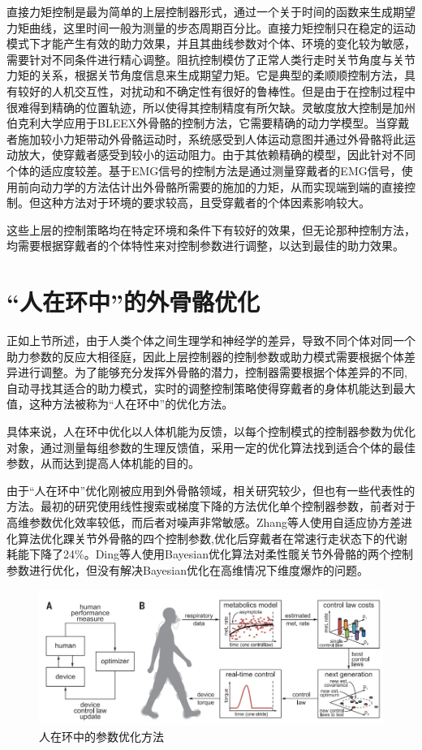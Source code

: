 直接力矩控制是最为简单的上层控制器形式，通过一个关于时间的函数来生成期望力矩曲线\cite{p32,p33}，这里时间一般为测量的步态周期百分比。直接力矩控制只在稳定的运动模式下才能产生有效的助力效果，并且其曲线参数对个体、环境的变化较为敏感，需要针对不同条件进行精心调整。阻抗控制模仿了正常人类行走时关节角度与关节力矩的关系，根据关节角度信息来生成期望力矩\cite{p34}。它是典型的柔顺顺控制方法，具有较好的人机交互性，对扰动和不确定性有很好的鲁棒性。但是由于在控制过程中很难得到精确的位置轨迹，所以使得其控制精度有所欠缺。灵敏度放大控制是加州伯克利大学应用于BLEEX外骨骼的控制方法\cite{p35}，它需要精确的动力学模型。当穿戴者施加较小力矩带动外骨骼运动时，系统感受到人体运动意图并通过外骨骼将此运动放大，使穿戴者感受到较小的运动阻力。由于其依赖精确的模型，因此针对不同个体的适应度较差。基于EMG信号的控制方法是通过测量穿戴者的EMG信号，使用前向动力学的方法估计出外骨骼所需要的施加的力矩，从而实现端到端的直接控制\cite{p36}。但这种方法对于环境的要求较高，且受穿戴者的个体因素影响较大。

这些上层的控制策略均在特定环境和条件下有较好的效果，但无论那种控制方法，均需要根据穿戴者的个体特性来对控制参数进行调整，以达到最佳的助力效果。

\section{“人在环中”的外骨骼优化}

正如上节所述，由于人类个体之间生理学和神经学的差异，导致不同个体对同一个助力参数的反应大相径庭\cite{p37}，因此上层控制器的控制参数或助力模式需要根据个体差异进行调整。为了能够充分发挥外骨骼的潜力，控制器需要根据个体差异的不同,自动寻找其适合的助力模式，实时的调整控制策略使得穿戴者的身体机能达到最大值，这种方法被称为“人在环中”的优化方法\cite{p38}。

具体来说，人在环中优化以人体机能为反馈，以每个控制模式的控制器参数为优化对象，通过测量每组参数的生理反馈值，采用一定的优化算法找到适合个体的最佳参数，从而达到提高人体机能的目的。

由于“人在环中”优化刚被应用到外骨骼领域，相关研究较少，但也有一些代表性的方法。最初的研究使用线性搜索\cite{p38}或梯度下降\cite{p39}的方法优化单个控制器参数，前者对于高维参数优化效率较低，而后者对噪声非常敏感。Zhang等人使用自适应协方差进化算法优化踝关节外骨骼的四个控制参数\cite{p40},优化后穿戴者在常速行走状态下的代谢耗能下降了24\%。Ding等人使用Bayesian优化算法对柔性髋关节外骨骼的两个控制参数进行优化\cite{p41}，但没有解决Bayesian优化在高维情况下维度爆炸的问题。

\begin{figure}[htb]
    \includegraphics[width=15cm]{fig/f18.jpg}
    \caption{人在环中的参数优化方法\cite{p40}}
    \label{fig:mark}
\end{figure}

